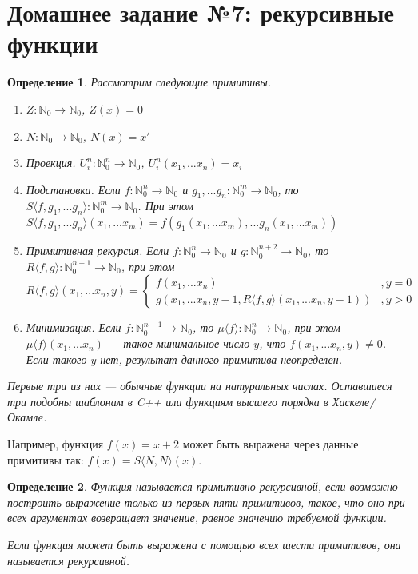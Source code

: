 \documentclass[10pt,a4paper,oneside]{article}
\newtheorem{definition}{Определение}
\begin{document}
\section*{Домашнее задание №7: рекурсивные функции}

\begin{definition}
Рассмотрим следующие примитивы. 
\begin{enumerate}
\item $Z: \mathbb{N}_0 \rightarrow \mathbb{N}_0$, $Z(x) = 0$
\item $N: \mathbb{N}_0 \rightarrow \mathbb{N}_0$, $N(x) = x'$
\item Проекция. $U^n_i: \mathbb{N}_0^n \rightarrow \mathbb{N}_0$, $U^n_i (x_1, ... x_n) = x_i$
\item Подстановка. Если $f: \mathbb{N}_0^n \rightarrow \mathbb{N}_0$ и $g_1, ... g_n: \mathbb{N}_0^m \rightarrow \mathbb{N}_0$, 
  то $S\langle{}f,g_1,...g_n\rangle: \mathbb{N}_0^m \rightarrow \mathbb{N}_0$.
При этом $S\langle{}f,g_1,...g_n\rangle (x_1,...x_m) = f(g_1(x_1,...x_m), ... g_n(x_1,...x_m))$
\item Примитивная рекурсия. Если $f: \mathbb{N}_0^n \rightarrow \mathbb{N}_0$ и $g: \mathbb{N}_0^{n+2} \rightarrow \mathbb{N}_0$, то
  $R\langle{}f,g\rangle: \mathbb{N}_0^{n+1} \rightarrow \mathbb{N}_0$, при этом
  $$R\langle{}f,g\rangle (x_1,...x_n,y) = \left\{\begin{array}{ll}
    f(x_1,...x_n) & , y = 0\\
    g(x_1,...x_n,y-1,R\langle{}f,g\rangle(x_1,...x_n,y-1)) &, y > 0
  \end{array}\right.$$
\item Минимизация. Если $f: \mathbb{N}_0^{n+1} \rightarrow \mathbb{N}_0$, то $\mu \langle{}f\rangle: \mathbb{N}_0^n \rightarrow \mathbb{N}_0$, при этом
  $\mu \langle{}f\rangle (x_1,...x_n)$ --- такое минимальное число $y$, что $f(x_1,...x_n,y) \ne 0$.
  Если такого $y$ нет, результат данного примитива неопределен.
\end{enumerate}

Первые три из них --- обычные функции на натуральных числах. Оставшиеся три подобны шаблонам в C++ или 
функциям высшего порядка в Хаскеле/Окамле.
\end{definition}

Например, функция $f(x)=x+2$ может быть выражена через данные примитивы так: $f(x) = S\langle N,N\rangle (x)$.

\begin{definition}
Функция называется примитивно-рекурсивной, если возможно построить выражение только из первых пяти примитивов,
такое, что оно при всех аргументах возвращает значение, равное значению требуемой функции.

Если функция может быть выражена с помощью всех шести примитивов, она называется рекурсивной.
\end{definition}
\end{document}
